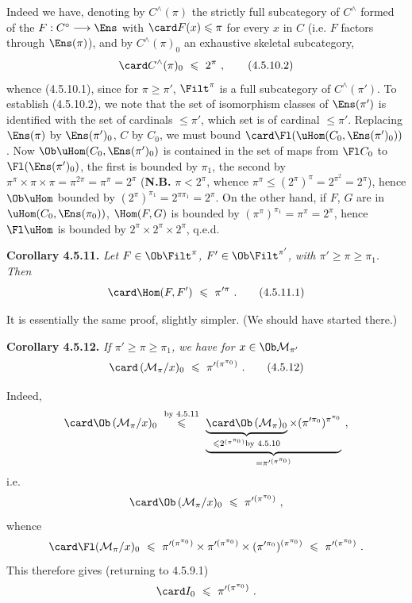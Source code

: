 Indeed we have, denoting by $C^\wedge(\pi)$ the strictly full subcategory of $C^\wedge$ formed of the $F : C^\circ \longrightarrow \Ens$ with $\card F(x) \leqslant \pi$ for every $x$ in $C$ (i.e. $F$ factors through $\Ens(\pi)$), and by $C^\wedge(\pi)_0$ an
exhaustive skeletal subcategory,
\[
\card C^\wedge(\pi)_0 \ \leqslant \ 2^\pi \ , \tag*{(4.5.10.2)}
\]
whence (4.5.10.1), since for $\pi \geqslant \pi'$, $\Filt^\pi$ is a full subcategory of $C^\wedge(\pi')$. To establish (4.5.10.2), we note that the set of isomorphism classes of $\Ens(\pi')$ is identified with the set of cardinals $\leqslant \pi'$, which set is of cardinal $\leqslant \pi'$. Replacing $\Ens(\pi)$ by $\Ens(\pi')_0$, $C$ by $C_0$, we must bound $\card \Fl(\uHom(C_0, \Ens(\pi')_0))$. Now $\Ob \uHom(C_0, \Ens(\pi')_0)$ is contained in the set of maps from $\Fl C_0$ to $\Fl(\Ens(\pi')_0)$, the first is bounded by $\pi_1$, the second by $\pi^\pi \times \pi \times \pi = \pi^{2\pi} = \pi^\pi = 2^\pi$ (\textbf{N.B.} $\pi < 2^\pi$, whence $\pi^\pi \leqslant (2^\pi)^\pi = 2^{\pi^2} = 2^\pi$), hence $\Ob \uHom$ bounded by $(2^\pi)^{\pi_1} = 2^{\pi\pi_1} = 2^\pi$. On the other hand, if $F$, $G$ are in $\uHom(C_0, \Ens(\pi_0))$, $\Hom(F,G)$ is bounded by $(\pi^\pi)^{\pi_1} = \pi^\pi = 2^\pi$, hence $\Fl \uHom$ is bounded by $2^\pi \times 2^\pi \times 2^\pi$, q.e.d.

\textbf{Corollary 4.5.11.} \textit{Let $F \in \Ob \Filt^\pi$, $F' \in \Ob \Filt^{\pi'}$, with $\pi' \geqslant \pi \geqslant \pi_1$. Then}
\[
\card \Hom(F, F') \ \leqslant \ \pi'^{\pi} \ . \tag*{(4.5.11.1)}
\]


It is essentially the same proof, slightly simpler. (We should have started there.)

\textbf{Corollary 4.5.12.} \textit{If $\pi' \geqslant \pi \geqslant \pi_1$, we have for $x \in \Ob \mathcal{M}_{\pi'}$}
\[
\card\,(\mathcal{M}_\pi/x)_0 \ \leqslant \ \pi'^{(\pi^{\pi_0})} \ . \tag*{(4.5.12)}
\]

Indeed,
\[
\card \Ob\,(\mathcal{M}_\pi/x)_0 \ \overset{\text{by 4.5.11}}{\leqslant} \ \underbrace{\underbrace{\card \Ob\,(\mathcal{M}_\pi)_0}_{\leqslant 2^{(\pi^{\pi_0})} \text{by 4.5.10}} \times (\pi'^{\pi_0})^{\pi^{\pi_0}}}_{= \pi'^{(\pi^{\pi_0})}} \ ,
\]
i.e.
\[
\card \Ob\,(\mathcal{M}_\pi/x)_0 \ \leqslant \ \pi'^{(\pi^{\pi_0})} \ ,
\]
whence
\[
\card \Fl(\mathcal{M}_\pi/x)_0 \ \leqslant \ \pi'^{(\pi^{\pi_0})} \times \pi'^{(\pi^{\pi_0})} \times (\pi'^{\pi_0})^{(\pi^{\pi_0})} \ \leqslant \ \pi'^{(\pi^{\pi_0})} \ .
\]
This therefore gives (returning to 4.5.9.1)
\[
\card I_0 \ \leqslant \ \pi'^{(\pi^{\pi_0})} \ .
\]

